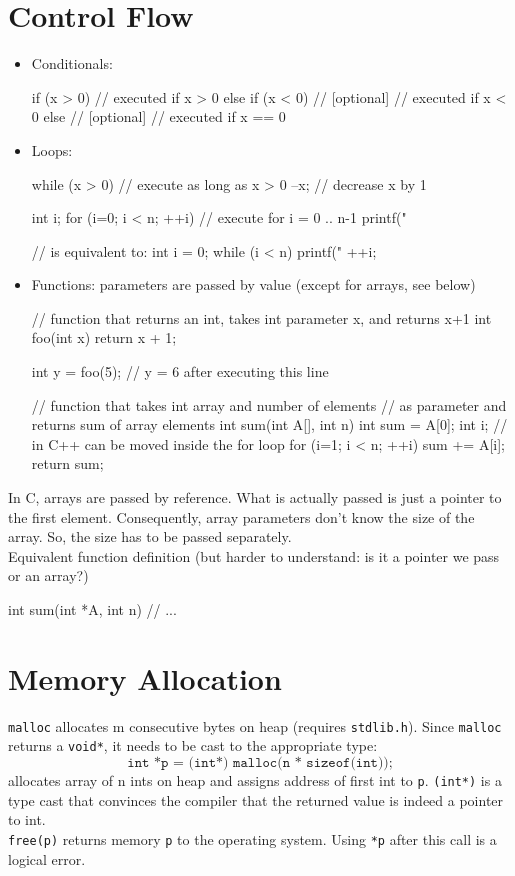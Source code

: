 \documentclass[a4paper,11pt]{article}
\begin{document}
\section{Control Flow}
\begin{itemize}
    \item Conditionals:
\begin{cppcode}
if (x > 0) {
    // executed if x > 0
} else if (x < 0) {     // [optional]
    // executed if x < 0
} 
else {                  // [optional]
    // executed if x == 0
} 
\end{cppcode}
    \item Loops:
\begin{cppcode}
while (x > 0) {     // execute as long as x > 0
    --x;            // decrease x by 1
}

int i;
for (i=0; i < n; ++i) {     // execute for i = 0 .. n-1
    printf("%
}

// is equivalent to:
int i = 0;
while (i < n) {
    printf("%
    ++i;
}
\end{cppcode}
    \item Functions: parameters are passed by value (except for arrays, see below)
\begin{cppcode}
// function that returns an int, takes int parameter x, and returns x+1
int foo(int x) { return x + 1; }

int y = foo(5); // y = 6 after executing this line

// function that takes int array and number of elements
// as parameter and returns sum of array elements
int sum(int A[], int n) {
    int sum = A[0];
    int i;  // in C++ can be moved inside the for loop
    for (i=1; i < n; ++i) {
        sum += A[i];
    }
    return sum;
}
\end{cppcode}
\end{itemize} 

In C, arrays are passed by reference. 
What is actually passed is just a pointer to the first element. 
Consequently, array parameters don't know the size of the array. 
So, the size has to be passed separately. \\

Equivalent function definition (but harder to understand: is it a pointer we pass or an array?)
\begin{cppcode}
int sum(int *A, int n) {
    // ...
}
\end{cppcode}


\section{Memory Allocation}
\texttt{malloc} allocates m consecutive bytes on heap (requires \texttt{stdlib.h}).
Since \texttt{malloc} returns a \texttt{void*}, it needs to be cast to the appropriate type:
\[ \texttt{int *p = (int*) malloc(n * sizeof(int));} \]
allocates array of n ints on heap and assigns address of first int to \texttt{p}. 
\texttt{(int*)} is a type cast that convinces the compiler that the returned value is indeed a pointer to int.\\

\texttt{free(p)} returns memory \texttt{p} to the operating system.
Using \texttt{*p} after this call is a logical error.
\end{document}
